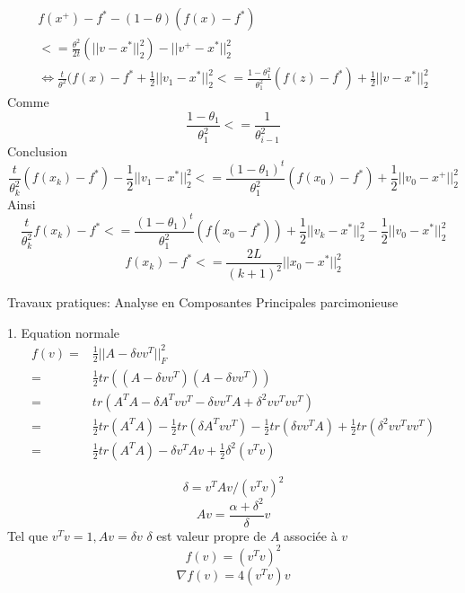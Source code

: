 \documentclass{article}
\begin{document}
\begin{equation}
\begin{split}
f(x^+)-f^*-(1-\theta)(f(x)-f^*)\\
<=\frac{\theta^2}{2t}(||v-x^*||_2^2)-||v^+-x^*||_2^2\\
\Leftrightarrow \frac{t}{\theta^2}(f(x)-f^*+\frac{1}{2}||v_1-x^*||_2^2<=\frac{1-\theta_1^2}{\theta_1^2}(f(z)-f^*)+\frac{1}{2}||v-x^*||_2^2
\end{split}
\end{equation}
Comme 
\begin{equation}
\frac{1-\theta_1}{\theta_1^2}<=\frac{1}{\theta_{i-1}^2}
\end{equation}
Conclusion
\begin{equation}
\frac{t}{\theta_k^2}(f(x_k)-f^*)-\frac{1}{2}||v_1-x^*||_2^2<=\frac{(1-\theta_1)^t}{\theta_1^2}(f(x_0)-f^*)+\frac{1}{2}||v_0-x^+||_2^2
\end{equation}
Ainsi
\begin{equation}
\frac{t}{\theta_k^2}f(x_k)-f^*<=\frac{(1-\theta_1)^t}{\theta_1^2}(f(x_0-f^*))+\frac{1}{2}||v_k-x^*||_2^2-\frac{1}{2}||v_0-x^*||_2^2
\end{equation}
\begin{equation}
f(x_k)-f^*<=\frac{2L}{(k+1)^2}||x_0-x^*||_2^2
\end{equation}


Travaux pratiques: Analyse en Composantes Principales parcimonieuse

1. Equation normale
\begin{equation}
\begin{split}
f(v)=&\frac{1}{2}||A-\delta v v^T||_F^2\\
=&\frac{1}{2}tr((A-\delta vv^T)(A-\delta v v^T))\\
=&tr(A^TA-\delta A^Tvv^T-\delta vv^TA+\delta^2vv^Tvv^T)\\
=&\frac{1}{2}tr(A^TA)-\frac{1}{2}tr(\delta A^Tvv^T)-\frac{1}{2}tr(\delta vv^TA)+\frac{1}{2}tr(\delta^2vv^Tvv^T)\\
=&\frac{1}{2}tr(A^TA)-\delta v^TAv+\frac{1}{2}\delta^2 (v^Tv)
\end{split}
\end{equation}

\begin{equation}
\delta=v^TAv/(v^Tv)^2
\end{equation}
\begin{equation}
Av=\frac{\alpha+\delta^2}{\delta}v
\end{equation}
Tel que $v^Tv=1, Av=\delta v$
$\delta$ est valeur propre de $A$ associ\'ee \`a $v$
\begin{equation}
f(v)=(v^Tv)^2
\end{equation}
\begin{equation}
\nabla f(v)=4(v^Tv)v
\end{equation}
\end{document}
